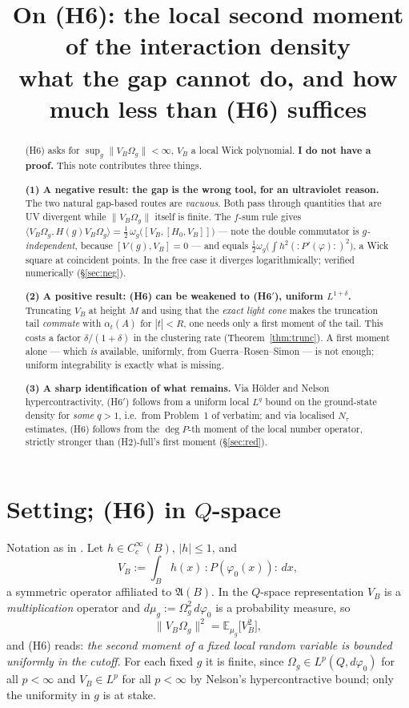 \documentclass[11pt,a4paper]{article}
\title{On (H6): the local second moment of the interaction density\\
\large what the gap cannot do, and how much less than (H6) suffices}
\author{}
\date{}
\theoremstyle{plain}
\theoremstyle{definition}
\newcommand{\A}{\mathfrak{A}}
\newcommand{\Om}{\Omega}
\newcommand{\ip}[2]{\langle #1,#2\rangle}
\begin{document}
\maketitle

\begin{abstract}
(H6) asks for $\sup_{g}\|V_B\Om_g\|<\infty$, $V_B$ a local Wick polynomial. \textbf{I do not have
a proof.} This note contributes three things.

\smallskip
\noindent\textbf{(1) A negative result: the gap is the wrong tool, for an ultraviolet reason.}
The two natural gap-based routes are \emph{vacuous}. Both pass through quantities that are
UV divergent while $\|V_B\Om_g\|$ itself is finite. The $f$-sum rule gives
$\ip{V_B\Om_g}{H(g)V_B\Om_g}=\tfrac12\,\omega_g\bigl([V_B,[H_0,V_B]]\bigr)$ --- note the double
commutator is \emph{$g$-independent}, because $[V(g),V_B]=0$ --- and equals
$\tfrac12\omega_g\bigl(\int h^2(:\!P'(\varphi)\!:)^2\bigr)$, a Wick square at coincident points.
In the free case it diverges logarithmically; verified numerically (\S\ref{sec:neg}).

\smallskip
\noindent\textbf{(2) A positive result: (H6) can be weakened to (H6$'$), uniform
$L^{1+\delta}$.} Truncating $V_B$ at height $M$ and using that the \emph{exact light cone} makes
the truncation tail \emph{commute} with $\alpha_t(A)$ for $|t|<R$, one needs only a first moment
of the tail. This costs a factor $\delta/(1+\delta)$ in the clustering rate
(Theorem~\ref{thm:trunc}). A first moment alone --- which \emph{is} available, uniformly, from
Guerra--Rosen--Simon --- is not enough; uniform integrability is exactly what is missing.

\smallskip
\noindent\textbf{(3) A sharp identification of what remains.} Via H\"older and Nelson
hypercontractivity, (H6$'$) follows from a uniform local $L^q$ bound on the ground-state density
for \emph{some} $q>1$, i.e.\ from Problem~1 of \cite{GRS75} verbatim; and via localised $N_\tau$
estimates, (H6) follows from the $\deg P$-th moment of the local number operator, strictly
stronger than (H2)-full's first moment (\S\ref{sec:red}).
\end{abstract}

\section{Setting; (H6) in $Q$-space}

Notation as in \cite{M0,M1,M3}. Let $h\in C_c^\infty(B)$, $|h|\le1$, and
\[
  V_B:=\int_B h(x)\,{:}P(\varphi_0(x)){:}\,dx ,
\]
a symmetric operator affiliated to $\A(B)$. In the $Q$-space representation $V_B$ is a
\emph{multiplication} operator and $d\mu_g:=\Om_g^2\,d\varphi_0$ is a probability measure, so
\begin{equation}\label{eq:qspace}
  \|V_B\Om_g\|^2=\mathbb E_{\mu_g}\bigl[V_B^2\bigr],
\end{equation}
and (H6) reads: \emph{the second moment of a fixed local random variable is bounded uniformly in
the cutoff}. For each fixed $g$ it is finite, since $\Om_g\in L^p(Q,d\varphi_0)$ for all
$p<\infty$ and $V_B\in L^p$ for all $p<\infty$ by Nelson's hypercontractive bound; only the
uniformity in $g$ is at stake.
\end{document}
